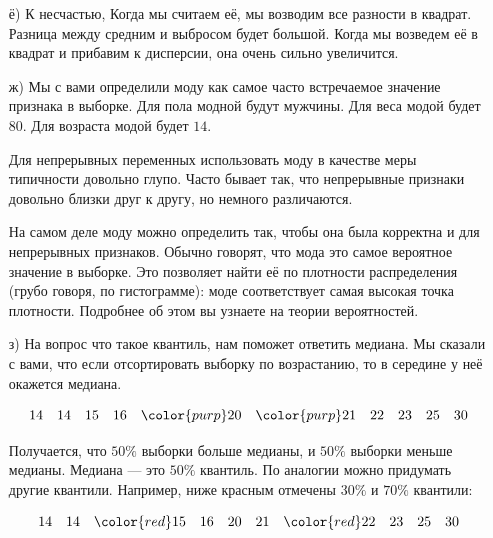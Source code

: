 \documentclass[12pt, a4paper, oneside]{article}
\begin{document}
\begin{sol}
\begin{enumerate}
\begin{center}
\end{center}	

	\item[ё)]  К несчастью,  Когда мы считаем её, мы возводим все разности в квадрат. Разница между средним и выбросом будет большой. Когда мы возведем её в квадрат и прибавим к дисперсии, она очень сильно увеличится. 
	
	\item[ж)] Мы с вами определили моду как самое часто встречаемое значение признака в выборке. Для пола модной будут мужчины. Для веса модой будет $80$. Для возраста модой будет $14$.  
	
	Для непрерывных переменных использовать моду в качестве меры типичности довольно глупо. Часто бывает так, что непрерывные признаки довольно близки друг к другу, но немного различаются.  
	
	На самом деле моду можно определить так, чтобы она была корректна и для непрерывных признаков. Обычно говорят, что мода это самое вероятное значение в выборке.  Это позволяет найти её по плотности распределения (грубо говоря, по гистограмме): моде соответствует самая высокая точка плотности. Подробнее об этом вы узнаете на теории вероятностей. 
	
	\item[з)]  На вопрос что такое квантиль, нам поможет ответить медиана. Мы сказали с вами, что если отсортировать выборку по возрастанию, то в середине у неё окажется медиана. 
	
	\[
	14 \quad 14  \quad 15  \quad 16  \quad {\color{purp} 20}  \quad {\color{purp} 21}  \quad 22  \quad 23  \quad 25  \quad 30
	\]
	
	Получается, что $50\%$ выборки больше медианы, и $50\%$ выборки меньше медианы. Медиана --- это $50\%$ квантиль. По аналогии можно придумать другие квантили. Например, ниже красным отмечены $30\%$ и $70\%$ квантили: 
	
	\[
	14 \quad 14  \quad {\color{red} 15}  \quad 16  \quad 20  \quad 21  \quad {\color{red} 22}  \quad 23  \quad 25  \quad 30
	\]
	

\end{enumerate}
\end{sol}
\end{document}
